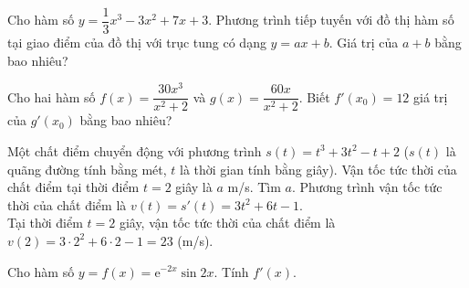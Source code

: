 \begin{bt}%
	Cho hàm số $y=\dfrac{1}{3}x^3-3x^2+7x+3$. Phương trình tiếp tuyến với đồ thị hàm số tại giao điểm của đồ thị với trục tung có dạng $y=ax+b$. Giá trị của $a+b$ bằng bao nhiêu?
\end{bt}

\begin{bt}%
	Cho hai hàm số $f(x)=\dfrac{30x^3}{x^2+2}$ và $g(x)=\dfrac{60x}{x^2+2}$. Biết $f'(x_0)=12$ giá trị của $g'(x_0)$ bằng bao nhiêu?
\end{bt}

\begin{ex}%
Một chất điểm chuyển động với phương trình $s(t)=t^3+3t^2-t+2$ ($s(t)$ là quãng đường tính bằng mét, $t$ là thời gian tính bằng giây). Vận tốc tức thời của chất điểm tại thời điểm $t=2$ giây là $a$ m/s. Tìm $a$.
\loigiai
{
Phương trình vận tốc tức thời của chất điểm là $v(t)=s'(t)=3t^2+6t-1$. \\
Tại thời điểm $t=2$ giây, vận tốc tức thời của chất điểm là $v(2)=3\cdot2^2+6\cdot 2-1=23$ (m/s).
}
\end{ex}

\begin{bt}%
	Cho hàm số $y=f(x)=\mathrm{e}^{-2x}\sin 2x$. Tính $f'(x)$.
\end{bt}

